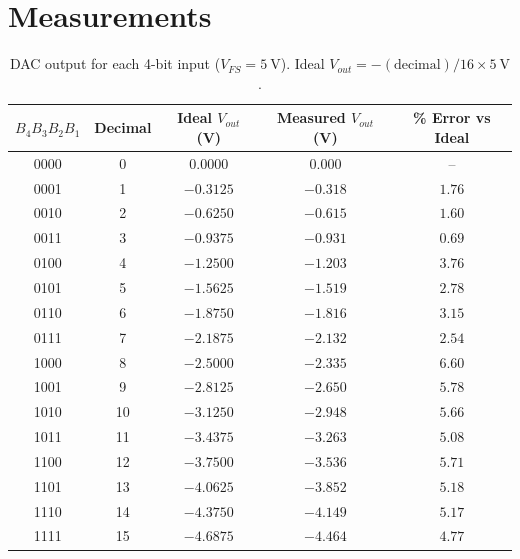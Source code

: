 \documentclass[11pt]{article}
\begin{document}
\section*{Measurements}

\begin{table}[H]
    \centering
    \caption{DAC output for each 4-bit input ($V_{FS} = \SI{5}{\volt}$). Ideal $V_{out} = -(\text{decimal})/16 \times \SI{5}{\volt}$.}
    \begin{tabular}{ccccc}
        \toprule
        $B_4 B_3 B_2 B_1$ & Decimal & Ideal $V_{out}$ (V) & Measured $V_{out}$ (V) & \% Error vs Ideal \\
        \midrule
        0000 & 0  & $0.0000$  & $0.000$  & --     \\
        0001 & 1  & $-0.3125$ & $-0.318$ & $1.76$ \\
        0010 & 2  & $-0.6250$ & $-0.615$ & $1.60$ \\
        0011 & 3  & $-0.9375$ & $-0.931$ & $0.69$ \\
        0100 & 4  & $-1.2500$ & $-1.203$ & $3.76$ \\
        0101 & 5  & $-1.5625$ & $-1.519$ & $2.78$ \\
        0110 & 6  & $-1.8750$ & $-1.816$ & $3.15$ \\
        0111 & 7  & $-2.1875$ & $-2.132$ & $2.54$ \\
        1000 & 8  & $-2.5000$ & $-2.335$ & $6.60$ \\
        1001 & 9  & $-2.8125$ & $-2.650$ & $5.78$ \\
        1010 & 10 & $-3.1250$ & $-2.948$ & $5.66$ \\
        1011 & 11 & $-3.4375$ & $-3.263$ & $5.08$ \\
        1100 & 12 & $-3.7500$ & $-3.536$ & $5.71$ \\
        1101 & 13 & $-4.0625$ & $-3.852$ & $5.18$ \\
        1110 & 14 & $-4.3750$ & $-4.149$ & $5.17$ \\
        1111 & 15 & $-4.6875$ & $-4.464$ & $4.77$ \\
        \bottomrule
    \end{tabular}
\end{table}

\end{document}
